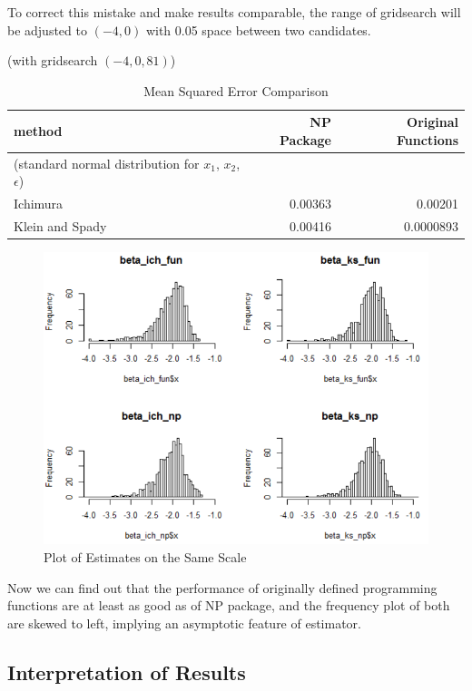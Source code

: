 \documentclass[a4paper]{article}
\begin{document}
To correct this mistake and make results comparable, the range of gridsearch will be adjusted to $(-4,0)$ with 0.05 space between two candidates.

\begin{table}[H]
\caption {Mean Squared Error Comparison} \label{tab:mean squared error}

(with gridsearch $(-4, 0, 81)$)

\begin{tabular}{l r r}

\toprule
\textbf{method} & \textbf{NP Package} & \textbf{Original Functions} \tabularnewline\midrule
(standard normal distribution for $x_1$, $x_2$, $\epsilon$) & &
\tabularnewline
Ichimura & 0.00363 & 0.00201 \tabularnewline
Klein and Spady & 0.00416 & 0.0000893 \tabularnewline

\bottomrule
\end{tabular}
\end{table}

\begin{figure}[h!]
  \caption{Plot of Estimates on the Same Scale}
  \includegraphics[width=\linewidth]{compare_done.png}
 
  \label{fig:plot of estimates on the same scale}
\end{figure}

Now we can find out that the performance of originally defined programming functions are at least as good as of NP package, and the frequency plot of both are skewed to left, implying an asymptotic feature of estimator.

\subsection{Interpretation of Results}
\label{interpretation of results}
\end{document}
